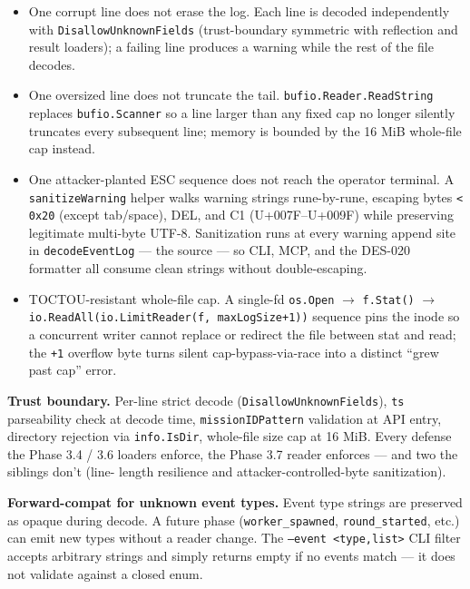 \documentclass[a4paper,10pt]{article}
\newcommand{\field}[1]{\texttt{#1}}
\begin{document}
\begin{itemize}
  \item One corrupt line does not erase the log.  Each line is
    decoded independently with \texttt{DisallowUnknownFields}
    (trust-boundary symmetric with reflection and result loaders);
    a failing line produces a warning while the rest of the file
    decodes.
  \item One oversized line does not truncate the tail.
    \texttt{bufio.Reader.ReadString} replaces \texttt{bufio.Scanner}
    so a line larger than any fixed cap no longer silently truncates
    every subsequent line; memory is bounded by the 16 MiB
    whole-file cap instead.
  \item One attacker-planted ESC sequence does not reach the
    operator terminal.  A \texttt{sanitizeWarning} helper walks
    warning strings rune-by-rune, escaping bytes \texttt{< 0x20}
    (except tab/space), DEL, and C1 (U+007F--U+009F) while
    preserving legitimate multi-byte UTF-8.  Sanitization runs at
    every warning append site in \texttt{decodeEventLog} --- the
    source --- so CLI, MCP, and the DES-020 formatter all consume
    clean strings without double-escaping.
  \item TOCTOU-resistant whole-file cap.  A single-fd \texttt{os.Open}
    $\to$ \texttt{f.Stat()} $\to$
    \texttt{io.ReadAll(io.LimitReader(f, maxLogSize+1))} sequence
    pins the inode so a concurrent writer cannot replace or
    redirect the file between stat and read; the \texttt{+1}
    overflow byte turns silent cap-bypass-via-race into a distinct
    ``grew past cap'' error.
\end{itemize}

\textbf{Trust boundary.}  Per-line strict decode
(\texttt{DisallowUnknownFields}), \field{ts} parseability check at
decode time, \texttt{missionIDPattern} validation at API entry,
directory rejection via \texttt{info.IsDir}, whole-file size cap at
16 MiB.  Every defense the Phase 3.4 / 3.6 loaders enforce, the
Phase 3.7 reader enforces --- and two the siblings don't (line-
length resilience and attacker-controlled-byte sanitization).

\textbf{Forward-compat for unknown event types.}  Event type strings
are preserved as opaque during decode.  A future phase
(\texttt{worker\_spawned}, \texttt{round\_started}, etc.) can emit
new types without a reader change.  The \texttt{--event <type,list>}
CLI filter accepts arbitrary strings and simply returns empty if no
events match --- it does not validate against a closed enum.
\end{document}
